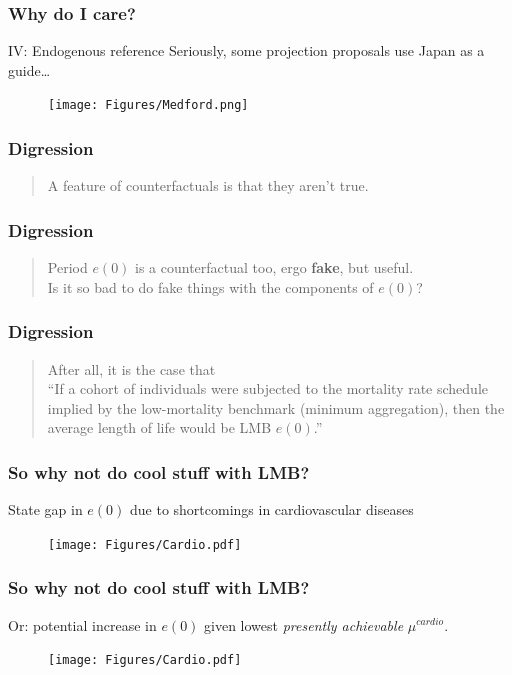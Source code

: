 \documentclass[20pt]{beamer}
\begin{document}
\begin{frame}
\frametitle{Why do I care?}
\begin{block}{IV: Endogenous reference}
Seriously, some projection proposals use Japan as a guide\ldots
\end{block}
\begin{figure}[b]
    \centering
    \texttt{[image: Figures/Medford.png]}
\end{figure} 
\end{frame}

\begin{frame}
\frametitle{Digression}
\begin{quote}
A feature of counterfactuals is that they aren't true.
\end{quote}
\end{frame}


\begin{frame}
\frametitle{Digression}
\begin{quote}
Period $e(0)$ is a counterfactual too, ergo \textbf{fake}, but useful.\\
Is it so bad to do fake things with the components of $e(0)$?
\end{quote}
\end{frame}


\begin{frame}
\frametitle{Digression}
\begin{quote}
After all, it is the case that \\
``If a cohort of individuals were subjected to
the mortality rate schedule implied by the low-mortality benchmark (minimum
aggregation), then the average length of life would be LMB $e(0)$.''
\end{quote}
\end{frame}

\begin{frame}
\frametitle{So why not do cool stuff with LMB?}
State gap in $e(0)$ due to shortcomings in cardiovascular diseases
\begin{figure}[b]
    \centering
    \texttt{[image: Figures/Cardio.pdf]}
\end{figure} 
\end{frame}

\begin{frame}
\frametitle{So why not do cool stuff with LMB?}
Or: potential increase in $e(0)$ given lowest \textit{presently
achievable} $\mu^{cardio}$.
 \begin{figure}[b]
    \centering
    \texttt{[image: Figures/Cardio.pdf]}
\end{figure} 
\end{frame}
\end{document}
